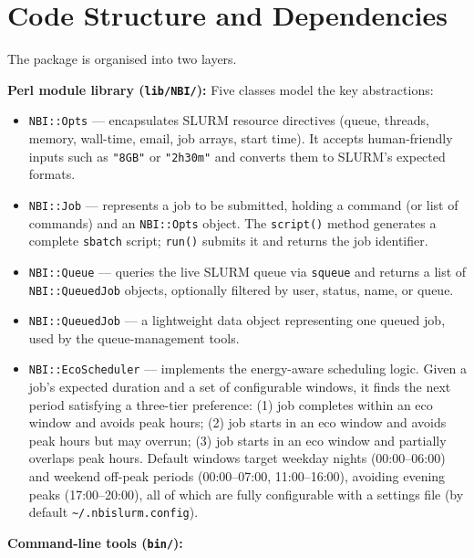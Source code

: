 \documentclass[
]{article}
\providecommand{\tightlist}{%
  \setlength{\itemsep}{0pt}\setlength{\parskip}{0pt}}
\begin{document}
\section{Code Structure and
Dependencies}\label{code-structure-and-dependencies}

The package is organised into two layers.

\textbf{Perl module library (\texttt{lib/NBI/}):} Five classes model the
key abstractions:

\begin{itemize}
\tightlist
\item
  \texttt{NBI::Opts} --- encapsulates SLURM resource directives (queue,
  threads, memory, wall-time, email, job arrays, start time). It accepts
  human-friendly inputs such as \texttt{"8GB"} or \texttt{"2h30m"} and
  converts them to SLURM's expected formats.
\item
  \texttt{NBI::Job} --- represents a job to be submitted, holding a
  command (or list of commands) and an \texttt{NBI::Opts} object. The
  \texttt{script()} method generates a complete \texttt{sbatch} script;
  \texttt{run()} submits it and returns the job identifier.
\item
  \texttt{NBI::Queue} --- queries the live SLURM queue via
  \texttt{squeue} and returns a list of \texttt{NBI::QueuedJob} objects,
  optionally filtered by user, status, name, or queue.
\item
  \texttt{NBI::QueuedJob} --- a lightweight data object representing one
  queued job, used by the queue-management tools.
\item
  \texttt{NBI::EcoScheduler} --- implements the energy-aware scheduling
  logic. Given a job's expected duration and a set of configurable
  windows, it finds the next period satisfying a three-tier preference:
  (1) job completes within an eco window and avoids peak hours; (2) job
  starts in an eco window and avoids peak hours but may overrun; (3) job
  starts in an eco window and partially overlaps peak hours. Default
  windows target weekday nights (00:00--06:00) and weekend off-peak
  periods (00:00--07:00, 11:00--16:00), avoiding evening peaks
  (17:00--20:00), all of which are fully configurable with a settings
  file (by default \texttt{\textasciitilde{}/.nbislurm.config}).
\end{itemize}

\textbf{Command-line tools (\texttt{bin/}):}
\end{document}
